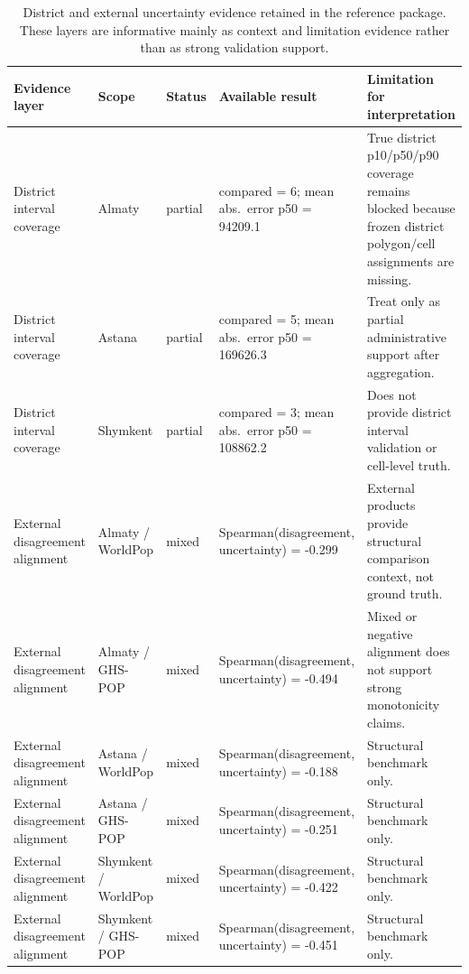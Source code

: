 \begin{table}[H]
\centering
\scriptsize
\caption{District and external uncertainty evidence retained in the reference package. These layers are informative mainly as context and limitation evidence rather than as strong validation support.}
\label{tab:district-external-uncertainty-unified}
\begin{tabular}{p{2.6cm}p{2.2cm}p{1.2cm}p{3.1cm}p{5.1cm}}
\toprule
Evidence layer & Scope & Status & Available result & Limitation for interpretation \\
\midrule
District interval coverage & Almaty & partial & compared = 6; mean abs.\ error p50 = 94209.1 & True district p10/p50/p90 coverage remains blocked because frozen district polygon/cell assignments are missing. \\
District interval coverage & Astana & partial & compared = 5; mean abs.\ error p50 = 169626.3 & Treat only as partial administrative support after aggregation. \\
District interval coverage & Shymkent & partial & compared = 3; mean abs.\ error p50 = 108862.2 & Does not provide district interval validation or cell-level truth. \\
External disagreement alignment & Almaty / WorldPop & mixed & Spearman(disagreement, uncertainty) = -0.299 & External products provide structural comparison context, not ground truth. \\
External disagreement alignment & Almaty / GHS-POP & mixed & Spearman(disagreement, uncertainty) = -0.494 & Mixed or negative alignment does not support strong monotonicity claims. \\
External disagreement alignment & Astana / WorldPop & mixed & Spearman(disagreement, uncertainty) = -0.188 & Structural benchmark only. \\
External disagreement alignment & Astana / GHS-POP & mixed & Spearman(disagreement, uncertainty) = -0.251 & Structural benchmark only. \\
External disagreement alignment & Shymkent / WorldPop & mixed & Spearman(disagreement, uncertainty) = -0.422 & Structural benchmark only. \\
External disagreement alignment & Shymkent / GHS-POP & mixed & Spearman(disagreement, uncertainty) = -0.451 & Structural benchmark only. \\
\bottomrule
\end{tabular}
\end{table}

